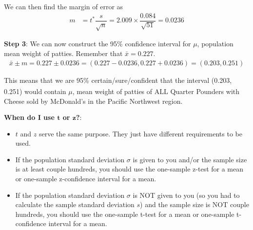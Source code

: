 \documentclass[12pt]{article}
\begin{document}
We can then find the margin of error as
\begin{align*}
m &= t^* \dfrac{s}{\sqrt{n}} 
= 2.009 \times \dfrac{0.084}{\sqrt{51}}
= 0.0236
\end{align*}

\noindent \textbf{Step 3}: We can now construct the 95\% confidence interval for $\mu$, population mean weight of patties. Remember that $\bar{x} = 0.227$.
\begin{align*}
\bar{x} \pm m = 0.227 \pm 0.0236 = (0.227 - 0.0236, 0.227 + 0.0236) = (0.203, 0.251)
\end{align*}

This means that we are 95\% certain/sure/confident that the interval (0.203, 0.251) would contain $\mu$, mean weight of patties of ALL Quarter Pounders\textsuperscript{\textregistered} with Cheese sold by McDonald's in the Pacific Northwest region.

\vspace{20 pt}

\textbf{When do I use $\boldsymbol{t}$ or $\boldsymbol{z}$?}:
\begin{itemize}
	\item $t$ and $z$ serve the same purpose. They just have different requirements to be used.
	\item If the population standard deviation $\sigma$ is given to you and/or the sample size is at least couple hundreds, you should use the one-sample z-test for a mean or one-sample z-confidence interval for a mean.
	\item If the population standard deviation $\sigma$ is NOT given to you (so you had to calculate the sample standard deviation $s$) and the sample size is NOT couple hundreds, you should use the one-sample t-test for a mean or one-sample t-confidence interval for a mean.
\end{itemize}
\end{document}
